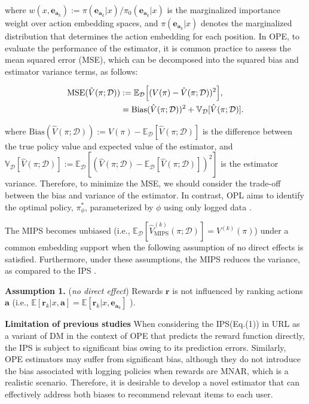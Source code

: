 where \( w(x, \boldsymbol{e}_{\boldsymbol{a}_k}) := \pi(\boldsymbol{e}_{\boldsymbol{a}_k}|x) / \pi_{0}(\boldsymbol{e}_{\boldsymbol{a}_k}|x) \) is the marginalized importance weight over action embedding spaces, and \( \pi(\boldsymbol{e}_{\boldsymbol{a}_k}|x) \) denotes the marginalized distribution that determines the action embedding for each position. In OPE, to evaluate the performance of the estimator, it is common practice to assess the mean squared error (MSE), which can be decomposed into the squared bias and estimator variance terms, as follows:

\vspace{-5mm}
\begin{align}
    \text{MSE}(\hat{V}(\pi;\mathcal{D})) &:= \mathbb{E}_{\mathcal{D}} \Big[(V(\pi) - \hat{V}(\pi;\mathcal{D}))^2 \Big], \\
    &= \text{Bias}(\hat{V}(\pi;\mathcal{D}))^2 + \mathbb{V}_{\mathcal{D}}[\hat{V}(\pi;\mathcal{D})]. \notag
\end{align}
\vspace{-5mm}

where \( \text{Bias}(\hat{V}(\pi;\mathcal{D})) := V(\pi) - \mathbb{E}_{\mathcal{D}}[\hat{V}(\pi;\mathcal{D})] \) is the difference between the true policy value and expected value of the estimator, and \( \mathbb{V}_{\mathcal{D}}[\hat{V}(\pi;\mathcal{D})] := \mathbb{E}_{\mathcal{D}}[(\hat{V}(\pi;\mathcal{D}) - \mathbb{E}_{\mathcal{D}}[\hat{V}(\pi;\mathcal{D})])^2] \) is the estimator variance. Therefore, to minimize the MSE, we should consider the trade-off between the bias and variance of the estimator. In contrast, OPL aims to identify the optimal policy, \( \pi_{\phi}^{*} \), parameterized by \( \phi \) using only logged data \cite{swaminathan2015counterfactual}.

The MIPS becomes unbiased (i.e., \( \mathbb{E}_{\mathcal{D}}[\hat{V}^{(k)}_{\text{MIPS}}(\pi;\mathcal{D})] = V^{(k)}(\pi) \)) under a common embedding support \cite{saito2022off} when the following assumption of no direct effects is satisfied. Furthermore, under these assumptions, the MIPS reduces the variance, as compared to the IPS \cite{saito2022off}.

\textbf{Assumption 1.} (\textit{no direct effect}) Rewards \( \boldsymbol{r} \) is not influenced by ranking actions \( \boldsymbol{a} \) (i.e., \( \mathbb{E}[\boldsymbol{r}_k|x,\boldsymbol{a}] = \mathbb{E}[\boldsymbol{r}_k|x,\boldsymbol{e}_{\boldsymbol{a}_k}] \) ).

\textbf{Limitation of previous studies} When considering the IPS(Eq.(1)) in URL as a variant of DM in the context of OPE that predicts the reward function directly, the IPS is subject to significant bias owing to its prediction errors. Similarly, OPE estimators may suffer from significant bias, although they do not introduce the bias associated with logging policies when rewards are MNAR, which is a realistic scenario. Therefore, it is desirable to develop a novel estimator that can effectively address both biases to recommend relevant items to each user.
